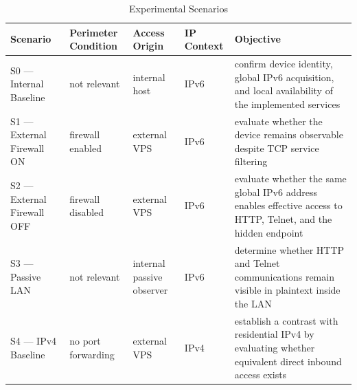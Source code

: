 \begin{table}[H]
    \centering
    \caption{Experimental Scenarios}
    \label{tab:experimental-scenarios}
    \begin{tabularx}{\textwidth}{p{} L L p{0.06\textwidth} L}
        \toprule
        \textbf{\color{white}Scenario} & \textbf{\color{white}Perimeter Condition} & \textbf{\color{white}Access Origin} & \textbf{\color{white}IP Context} & \textbf{\color{white}Objective} \\
        \midrule
        S0 — Internal Baseline & not relevant & internal host & IPv6 & confirm device identity, global IPv6 acquisition, and local availability of the implemented services \\
        S1 — External Firewall ON & firewall enabled & external VPS & IPv6 & evaluate whether the device remains observable despite TCP service filtering \\
        S2 — External Firewall OFF & firewall disabled & external VPS & IPv6 & evaluate whether the same global IPv6 address enables effective access to HTTP, Telnet, and the hidden endpoint \\
        S3 — Passive LAN & not relevant & internal passive observer & IPv6 & determine whether HTTP and Telnet communications remain visible in plaintext inside the LAN \\
        S4 — IPv4 Baseline & no port forwarding & external VPS & IPv4 & establish a contrast with residential IPv4 by evaluating whether equivalent direct inbound access exists \\
        \bottomrule
    \end{tabularx}
\end{table}
